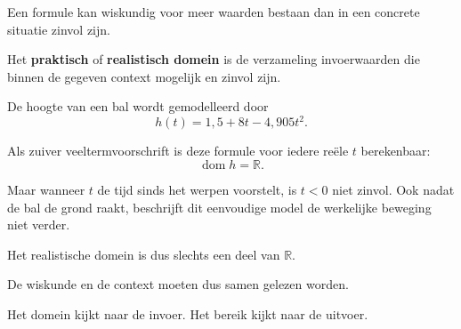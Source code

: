 \documentclass{ximera}
\begin{document}
Een formule kan wiskundig voor meer waarden bestaan dan in een concrete
situatie zinvol zijn.

\begin{definitie}
Het \textbf{praktisch} of \textbf{realistisch domein} is de verzameling
invoerwaarden die binnen de gegeven context mogelijk en zinvol zijn.
\end{definitie}

\begin{voorbeeld}

De hoogte van een bal wordt gemodelleerd door
\[
h(t)=1{,}5+8t-4{,}905t^2.
\]

Als zuiver veeltermvoorschrift is deze formule voor iedere reële \(t\) berekenbaar:
\[
\operatorname{dom}h=\mathbb{R}.
\]

Maar wanneer \(t\) de tijd sinds het werpen voorstelt, is \(t<0\) niet zinvol.
Ook nadat de bal de grond raakt, beschrijft dit eenvoudige model de werkelijke
beweging niet verder.

Het realistische domein is dus slechts een deel van \(\mathbb{R}\).

\begin{center}
\end{center}

De wiskunde en de context moeten dus samen gelezen worden.
\end{voorbeeld}




Het domein kijkt naar de invoer. Het bereik kijkt naar de uitvoer.
\end{document}
